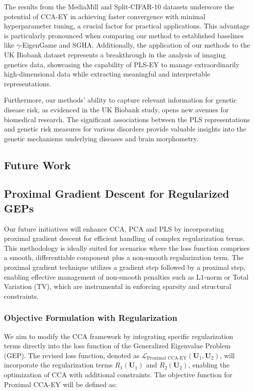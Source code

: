 The results from the MediaMill and Split-CIFAR-10 datasets underscore the potential of CCA-EY in achieving faster convergence with minimal hyperparameter tuning, a crucial factor for practical applications.
This advantage is particularly pronounced when comparing our method to established baselines like $\gamma$-EigenGame and SGHA. Additionally, the application of our methods to the UK Biobank dataset represents a breakthrough in the analysis of imaging genetics data, showcasing the capability of PLS-EY to manage extraordinarily high-dimensional data while extracting meaningful and interpretable representations.

Furthermore, our methods' ability to capture relevant information for genetic disease risk, as evidenced in the UK Biobank study, opens new avenues for biomedical research.
The significant associations between the PLS representations and genetic risk measures for various disorders provide valuable insights into the genetic mechanisms underlying diseases and brain morphometry.

\subsection{Future Work}

\subsection{Proximal Gradient Descent for Regularized GEPs}

Our future initiatives will enhance CCA, PCA and PLS by incorporating proximal gradient descent for efficient handling of complex regularization terms. This methodology is ideally suited for scenarios where the loss function comprises a smooth, differentiable component plus a non-smooth regularization term. The proximal gradient technique utilizes a gradient step followed by a proximal step, enabling effective management of non-smooth penalties such as L1-norm or Total Variation (TV), which are instrumental in enforcing sparsity and structural constraints.

\subsubsection{Objective Formulation with Regularization}

We aim to modify the CCA framework by integrating specific regularization terms directly into the loss function of the Generalized Eigenvalue Problem (GEP). The revised loss function, denoted as $\mathcal{L}_{\text{Proximal CCA-EY}}(\mathbf{U}_1, \mathbf{U}_2)$, will incorporate the regularization terms $R_1(\mathbf{U}_1)$ and $R_2(\mathbf{U}_2)$, enabling the optimization of CCA with additional constraints. The objective function for Proximal CCA-EY will be defined as:

